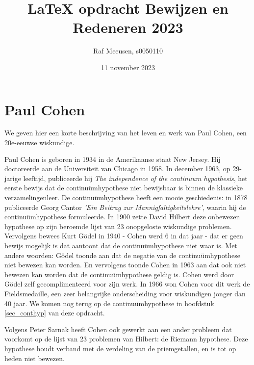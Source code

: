 \documentclass[hidelinks,11pt,a4paper]{article}
\title{LaTeX opdracht Bewijzen en Redeneren 2023}
\author{Raf Meeusen, s0050110}
\date{11 november 2023}
\begin{document}
\maketitle

\section{Paul Cohen}
We geven hier een korte beschrijving van het leven en werk van Paul Cohen, een 20e-eeuwse wiskundige. 

Paul Cohen is geboren in 1934 in de Amerikaanse staat New Jersey.  
Hij doctoreerde aan de Universiteit van Chicago in 1958. 
In december 1963, op 29-jarige leeftijd, publiceerde hij \emph{The independence of the continuum hypothesis}, 
het eerste bewijs dat de continu\"um\-hypothese niet bewijsbaar is binnen de klassieke verzamelingenleer. 
De continu\"um\-hypothese heeft een mooie geschiedenis: in 1878 publiceerde Georg Cantor \emph{'Ein Beitrag zur Mannigfaltigkeitslehre'}, waarin hij de continu\"um\-hypothese formuleerde. In 1900 zette David Hilbert deze onbewezen hypothese op zijn beroemde lijst van 23 onopgeloste wiskundige problemen. Vervolgens bewees Kurt G\"odel in 1940 - Cohen werd 6 in dat jaar - dat er geen bewijs mogelijk is dat aantoont dat de continu\"um\-hypothese niet waar is. Met andere woorden: G\"odel toonde aan dat de negatie van de continu\"um\-hypothese niet bewezen kan worden. En vervolgens toonde Cohen in 1963 aan dat ook niet bewezen kan worden dat de continu\"um\-hypothese geldig is. 
Cohen werd door G\"odel zelf gecomplimenteerd voor zijn werk. 
In 1966 won Cohen voor dit werk de Fieldsmedaille, een zeer belangrijke onderscheiding voor wiskundigen jonger dan 40 jaar. 
We komen nog terug op de continu\"um\-hypothese  in hoofdstuk \ref{sec_conthyp} van deze opdracht. 

Volgens Peter Sarnak heeft Cohen ook gewerkt aan een ander probleem dat voorkomt op de lijst van 23 problemen van Hilbert: 
de Riemann hypothese. Deze hypothese houdt verband met de verdeling van de priemgetallen, en is tot op heden niet bewezen. 
\end{document}
